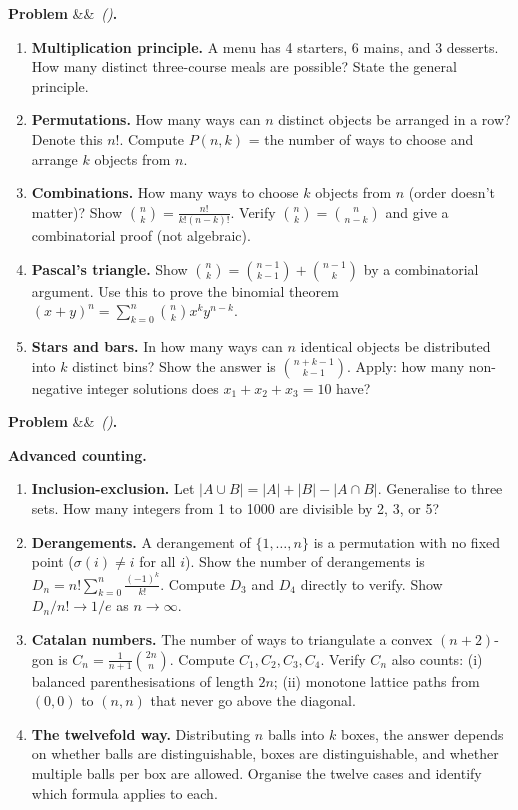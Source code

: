 \documentclass[12pt, a4paper]{article}
\newcounter{problem}
\newenvironment{problem}[1][]{%
  \refstepcounter{problem}%
  \par\vspace{6pt}%
  \noindent\textbf{\color{MidBlue}Problem \theproblem}%
  \ifx&#1&\else\ \textit{(#1)}\fi\textbf{.}\enskip
}{\par\vspace{4pt}}
\begin{document}
\begin{problem}
\label{prob:counting}
\begin{enumerate}[label=(\alph*),topsep=2pt]
  \item \textbf{Multiplication principle.} A menu has 4 starters, 6 mains, and 3 desserts. How many distinct three-course meals are possible? State the general principle.
  \item \textbf{Permutations.} How many ways can $n$ distinct objects be arranged in a row? Denote this $n!$. Compute $P(n,k)$ = the number of ways to choose and arrange $k$ objects from $n$.
  \item \textbf{Combinations.} How many ways to choose $k$ objects from $n$ (order doesn't matter)? Show $\binom{n}{k} = \frac{n!}{k!(n-k)!}$. Verify $\binom{n}{k}=\binom{n}{n-k}$ and give a combinatorial proof (not algebraic).
  \item \textbf{Pascal's triangle.} Show $\binom{n}{k}=\binom{n-1}{k-1}+\binom{n-1}{k}$ by a combinatorial argument. Use this to prove the binomial theorem $(x+y)^n = \sum_{k=0}^n\binom{n}{k}x^k y^{n-k}$.
  \item \textbf{Stars and bars.} In how many ways can $n$ identical objects be distributed into $k$ distinct bins? Show the answer is $\binom{n+k-1}{k-1}$. Apply: how many non-negative integer solutions does $x_1+x_2+x_3=10$ have?
\end{enumerate}
\end{problem}

\begin{problem}
\label{prob:advanced_counting}
\textbf{Advanced counting.}
\begin{enumerate}[label=(\alph*),topsep=2pt]
  \item \textbf{Inclusion-exclusion.} Let $|A\cup B| = |A|+|B|-|A\cap B|$. Generalise to three sets. How many integers from 1 to 1000 are divisible by 2, 3, or 5?
  \item \textbf{Derangements.} A derangement of $\{1,\ldots,n\}$ is a permutation with no fixed point ($\sigma(i)\neq i$ for all $i$). Show the number of derangements is $D_n = n!\sum_{k=0}^n\frac{(-1)^k}{k!}$. Compute $D_3$ and $D_4$ directly to verify. Show $D_n/n!\to 1/e$ as $n\to\infty$.
  \item \textbf{Catalan numbers.} The number of ways to triangulate a convex $(n+2)$-gon is $C_n = \frac{1}{n+1}\binom{2n}{n}$. Compute $C_1,C_2,C_3,C_4$. Verify $C_n$ also counts: (i) balanced parenthesisations of length $2n$; (ii) monotone lattice paths from $(0,0)$ to $(n,n)$ that never go above the diagonal.
  \item \textbf{The twelvefold way.} Distributing $n$ balls into $k$ boxes, the answer depends on whether balls are distinguishable, boxes are distinguishable, and whether multiple balls per box are allowed. Organise the twelve cases and identify which formula applies to each.
\end{enumerate}
\end{problem}
\end{document}
